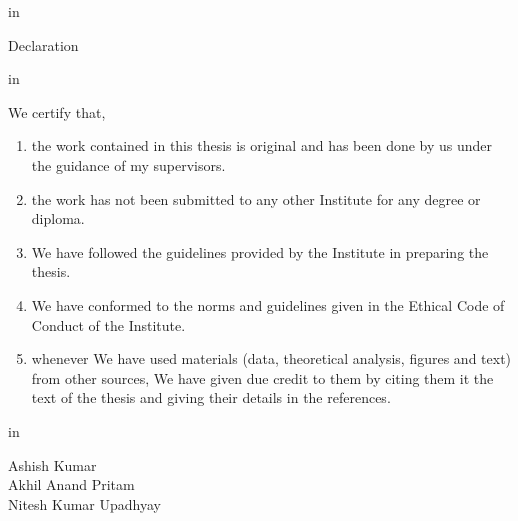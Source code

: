 

\mbox{}
\thispagestyle{empty}
\newpage



\graphicspath{{Certificates/Figures/}}


\begin{titlepage}



 in
\begin{center}
\huge Declaration
\end{center}
 in




We certify that,
\begin{enumerate}
\item the work contained in this thesis is original and has been done by us under the guidance of my supervisors.
\item the work has not been submitted to any other Institute for any degree or diploma.
\item We have followed the guidelines provided by the Institute in preparing the thesis.
\item We have conformed to the norms and guidelines given in the Ethical Code of Conduct of the Institute.
\item whenever We have used materials (data, theoretical analysis, figures and text) from other sources, We have given due credit to them by citing them it the text of the thesis and giving their details in the references.
\end{enumerate}


 in
\begin{flushright}
Ashish Kumar\\
Akhil Anand Pritam\\
Nitesh Kumar Upadhyay

\end{flushright}




\end{titlepage}




